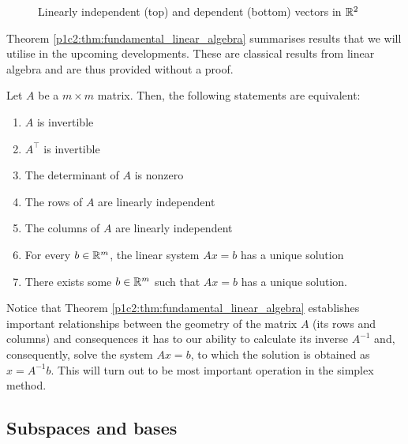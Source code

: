 \begin{figure}[h]
	\centering
	\caption{Linearly independent (top) and dependent (bottom) vectors in $\mathbb{R}^2$}\label{p1c2:fig:linear_independence}
\end{figure}

Theorem \ref{p1c2:thm:fundamental_linear_algebra} summarises results that we will utilise in the upcoming developments. These are classical results from linear algebra and are thus provided without a proof.
%
\begin{theorem}[Inverses, linear independence, and solving $Ax = b$] \label{p1c2:thm:fundamental_linear_algebra}
	Let $A$ be a $m \times m$ matrix. Then, the following statements are equivalent:
	\begin{enumerate}
		\item $A$ is invertible
		\item $A^\top$ is invertible
		\item The determinant of $A$ is nonzero
		\item The rows of $A$ are linearly independent
		\item The columns of $A$ are linearly independent
		\item For every $b \in \mathbb{R}^m$, the linear system $Ax = b$ has a unique solution
		\item There exists some $b \in \mathbb{R}^m$ such that $Ax = b$ has a unique solution.	
	\end{enumerate}	
\end{theorem}
%
Notice that Theorem \ref{p1c2:thm:fundamental_linear_algebra} establishes important relationships between the geometry of the matrix $A$ (its rows and columns) and consequences it has to our ability to calculate its inverse $A^{-1}$ and, consequently, solve the system $Ax = b$, to which the solution is obtained as $x = A^{-1}b$. This will turn out to be most important operation in the simplex method.


\subsection{Subspaces and bases}

